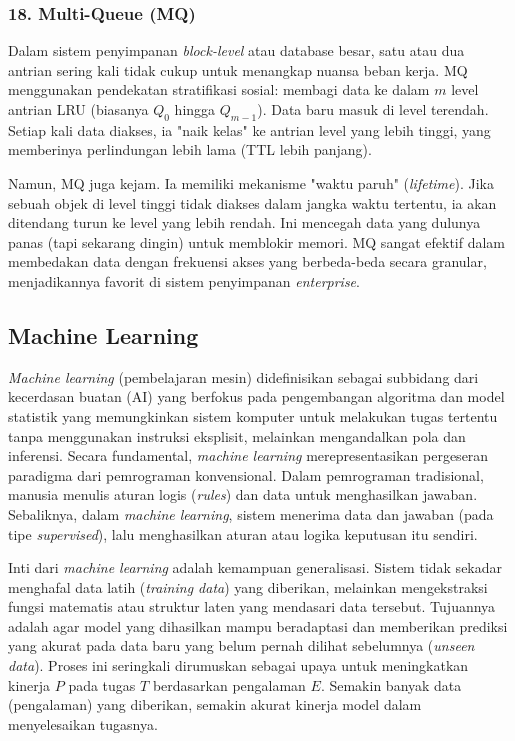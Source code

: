 \subsubsection{18. Multi-Queue (MQ)}
Dalam sistem penyimpanan \textit{block-level} atau database besar,
satu atau dua antrian sering kali tidak cukup untuk menangkap nuansa
beban kerja.
MQ~\cite{Zhou2001MQ} menggunakan pendekatan stratifikasi sosial:
membagi data ke dalam $m$ level antrian LRU (biasanya $Q_0$ hingga $Q_{m-1}$).
Data baru masuk di level terendah.
Setiap kali data diakses, ia "naik kelas" ke antrian level yang lebih
tinggi, yang memberinya perlindungan lebih lama (TTL lebih panjang).

Namun, MQ juga kejam. Ia memiliki mekanisme "waktu paruh" (\textit{lifetime}).
Jika sebuah objek di level tinggi tidak diakses dalam jangka waktu
tertentu, ia akan ditendang turun ke level yang lebih rendah.
Ini mencegah data yang dulunya panas (tapi sekarang dingin) untuk
memblokir memori.
MQ sangat efektif dalam membedakan data dengan frekuensi akses yang
berbeda-beda secara granular, menjadikannya favorit di sistem
penyimpanan \textit{enterprise}.

\subsection{Machine Learning}

\textit{Machine learning} (pembelajaran mesin) didefinisikan sebagai subbidang
dari kecerdasan buatan (AI) yang berfokus pada pengembangan algoritma
dan model statistik yang memungkinkan sistem komputer untuk melakukan tugas
tertentu tanpa menggunakan instruksi eksplisit, melainkan mengandalkan pola
dan inferensi. Secara fundamental, \textit{machine learning} merepresentasikan
pergeseran paradigma dari pemrograman konvensional.
Dalam pemrograman tradisional, manusia menulis aturan logis (\textit{rules})
dan data untuk menghasilkan jawaban.
Sebaliknya, dalam \textit{machine learning}, sistem menerima data dan jawaban
(pada tipe \textit{supervised}), lalu menghasilkan aturan atau logika keputusan
itu sendiri.

Inti dari \textit{machine learning} adalah kemampuan generalisasi.
Sistem tidak sekadar menghafal data latih (\textit{training data})
yang diberikan,
melainkan mengekstraksi fungsi matematis atau struktur laten yang
mendasari data tersebut.
Tujuannya adalah agar model yang dihasilkan mampu beradaptasi dan memberikan
prediksi yang akurat pada data baru yang belum pernah dilihat sebelumnya
(\textit{unseen data}).
Proses ini seringkali dirumuskan sebagai upaya untuk meningkatkan kinerja $P$
pada tugas $T$ berdasarkan pengalaman $E$.
Semakin banyak data (pengalaman) yang diberikan, semakin akurat kinerja model
dalam menyelesaikan tugasnya.

